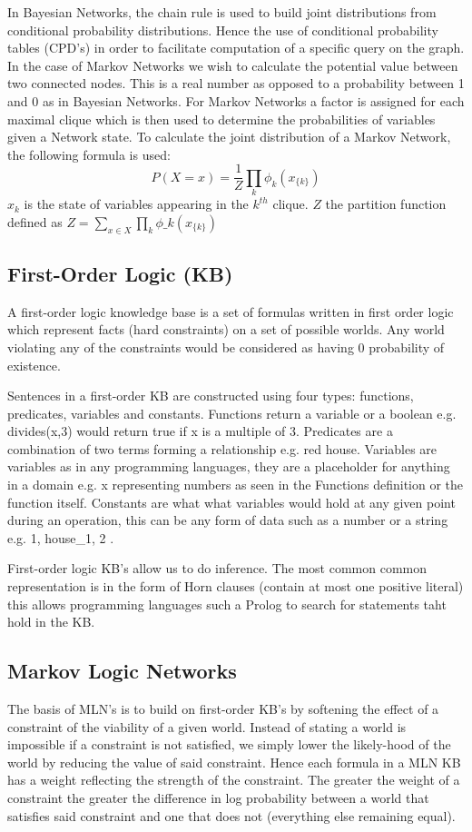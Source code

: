 In Bayesian Networks, the chain rule is used to build joint distributions from conditional probability distributions. Hence the use of conditional probability tables (CPD's) in order to facilitate computation of a specific query on the graph. In the case of Markov Networks we wish to calculate the potential value between two connected nodes. This is a real number as opposed to a probability between 1 and 0 as in Bayesian Networks. For Markov Networks a factor is assigned for each maximal clique which is then used to determine the probabilities of variables given a Network state.
To calculate the joint distribution of a Markov Network, the following formula is used: \[P(X=x) = \frac{1}{Z}\prod_k \phi_k(x_{\{k\}})\]
\(x_k\) is the state of variables appearing in the \(k^{th}\) clique.
\(Z\) the partition function defined as \(Z=\sum_{x\in X}\prod_k \phi\_k(x_{\{k\}})\)
\cite{mlj05pdf51:online}

\subsection{First-Order Logic (KB)}
A first-order logic knowledge base is a set of formulas written in first order logic which represent facts (hard constraints) on a set of possible worlds. Any world violating any of the constraints would be considered as having 0 probability of existence.

Sentences in a first-order KB are constructed using four types: functions, predicates, variables and constants. Functions return a variable or a boolean e.g. divides(x,3) would return true if x is a multiple of 3. Predicates are a combination of two terms forming a relationship e.g. red house. Variables are variables as in any programming languages, they are a placeholder for anything in a domain e.g. x representing numbers as seen in the Functions definition or the function itself. Constants are what what variables would hold at any given point during an operation, this can be any form of data such as a number or a string e.g. 1, house_1, 2 .

First-order logic KB's allow us to do inference. The most common common representation is in the form of Horn clauses (contain at most one positive literal) this allows programming languages such a Prolog to search for statements taht hold in the KB.

\subsection{Markov Logic Networks}
The basis of MLN's is to build on first-order KB's by softening the effect of a constraint of the viability of a given world. Instead of stating a world is impossible if a constraint is not satisfied, we simply lower the likely-hood of the world by reducing the value of said constraint. Hence each formula in a MLN KB has a weight reflecting the strength of the constraint. The greater the weight of a constraint the greater the difference in log probability between a world that satisfies said constraint and one that does not (everything else remaining equal).
\newpage



